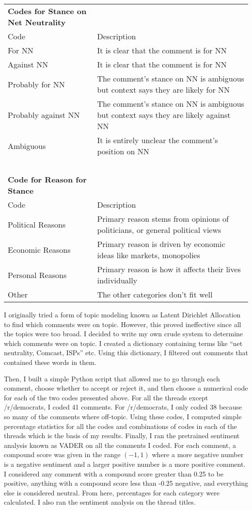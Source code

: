 \documentclass[11pt]{article}
\begin{document}
	\begin{small}
		\begin{tabular}{l|l}
			\multicolumn{1}{l}{\textbf{Codes for Stance on Net Neutrality}} & \\
			Code & Description \\\hline
			For NN & It is clear that the comment is for NN \\
			Against NN & It is clear that the comment is for NN \\
			Probably for NN & The comment's stance on NN is ambiguous but context says they are likely for NN \\
			Probably against NN & The comment's stance on NN is ambiguous but context says they are likely against NN \\
			Ambiguous & It is entirely unclear the comment's position on NN \\
			\multicolumn{1}{l}{} & \ \\
			\multicolumn{1}{l}{\textbf{Code for Reason for Stance}} & \\
			Code  & Description \\\hline
			Political Reasons & Primary reason stems from opinions of politicians, or general political views \\
			Economic Reasons & Primary reason is driven by economic ideas like markets, monopolies\\
			Personal Reasons & Primary reason is how it affects their lives individually  \\
			Other & The other categories don't fit well
		\end{tabular}
	\end{small}
	
	
	I originally tried a form of topic modeling known as Latent Dirichlet Allocation to find which comments were on topic. However, this proved ineffective since all the topics were too broad. I decided to write my own crude system to determine which comments were on topic. I created a dictionary containing terms like ``net neutrality, Comcast, ISPs'' etc. Using this dictionary, I filtered out comments that contained these words in them. 
	
	Then, I built a simple Python script that allowed me to go through each comment, choose whether to accept or reject it, and then choose a numerical code for each of the two codes presented above. For all the threads except /r/democrats, I coded 41 comments. For /r/democrats, I only coded 38 because so many of the comments where off-topic. Using these codes, I computed simple percentage statistics for all the codes and combinations of codes in each of the threads which is the basis of my results. Finally, I ran the pretrained sentiment analysis known as VADER \cite{hutto2014vader} on all the comments I coded. For each comment, a compound score was given in the range $(-1,1)$ where a more negative number is a negative sentiment and a larger positive number is a more positive comment. I considered any comment with a compound score greater than 0.25 to be positive, anything with a compound score less than -0.25 negative, and everything else is considered neutral. From here, percentages for each category were calculated. I also ran the sentiment analysis on the thread titles. 
\end{document}
